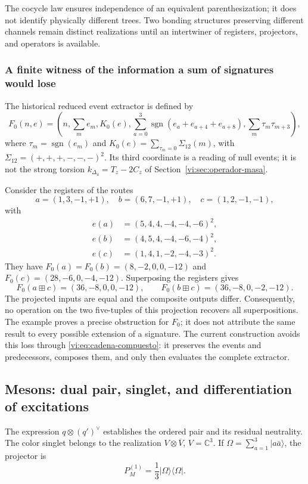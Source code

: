 The cocycle law ensures independence of an equivalent parenthesization;
it does not identify physically different trees. Two bonding structures
preserving different channels remain distinct realizations
until an intertwiner of registers, projectors, and operators is available.

\subsubsection{A finite witness of the information a sum of signatures would lose}

The historical reduced event extractor is defined by
\[
 F_0(n,e)=\left(n,\sum_m e_m,K_0(e),
 \sum_{a=0}^3\operatorname{sgn}(e_a+e_{a+4}+e_{a+8}),
 \sum_m\tau_m\tau_{m+3}\right),
\]
where \(\tau_m=\operatorname{sgn}(e_m)\) and
\(K_0(e)=\sum_{\tau_m=0}\Sigma_{12}(m)\), with
\(\Sigma_{12}=(+,+,+,-,-,-)^2\). Its third coordinate is a
reading of null events; it is not the strong torsion
\(k_{\Delta_4}=T_z-2C_z\) of
Section~\ref{vi:sec:operador-masa}.

Consider the registers of the routes
\[
 a=(1,3,-1,+1),\quad b=(6,7,-1,+1),\quad c=(1,2,-1,-1),
\]
with
\begin{align*}
 e(a)&=(5,4,4,-4,-4,-6)^2,\\
 e(b)&=(4,5,4,-4,-6,-4)^2,\\
 e(c)&=(1,4,1,-2,-4,-3)^2.
\end{align*}
They have \(F_0(a)=F_0(b)=(8,-2,0,0,-12)\) and
\(F_0(c)=(28,-6,0,-4,-12)\). Superposing the registers gives
\[
 F_0(a\boxplus c)=(36,-8,0,0,-12),\qquad
 F_0(b\boxplus c)=(36,-8,0,-2,-12).
\]
The projected inputs are equal and the composite outputs differ.
Consequently, no operation on the two five-tuples of this
projection recovers all superpositions. The example proves a
precise obstruction for \(F_0\); it does not attribute the same result to every
possible extension of a signature. The current construction avoids this
loss through \eqref{vi:eq:cadena-compuesto}: it preserves the events
and predecessors, composes them, and only then evaluates the complete extractor.

\subsection{Mesons: dual pair, singlet, and differentiation of excitations}
\label{vi:subsec:mesones-familias}

The expression \(q\otimes(q')^\vee\) establishes the ordered pair and its
residual neutrality. The color singlet belongs to the realization
\(V\otimes\overline V\), \(V=\mathbb C^3\). If
\(\Omega=\sum_{a=1}^3|a\bar a\rangle\), the projector is
\begin{equation}
 P_M^{(1)}=\frac13|\Omega\rangle\langle\Omega|.
 \label{vi:eq:singlete-meson}
\end{equation}

